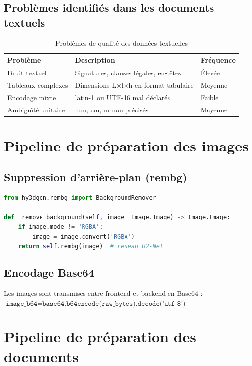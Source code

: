 \documentclass[12pt,a4paper,oneside]{report}
\newcommand{\theadrow}{\rowcolor{tekupblue!12}}
\begin{document}
\subsection{Problèmes identifiés dans les documents textuels}
\begin{table}[H]
\centering
\caption{Problèmes de qualité des données textuelles}
\label{tab:dq}
\begin{tabularx}{\linewidth}{@{}lXl@{}}
\toprule
\theadrow
\textbf{Problème} & \textbf{Description} & \textbf{Fréquence} \\\midrule
Bruit textuel     & Signatures, clauses légales, en-têtes & Élevée \\
Tableaux complexes& Dimensions L×l×h en format tabulaire & Moyenne \\
Encodage mixte    & latin-1 ou UTF-16 mal déclarés & Faible \\
Ambiguïté unitaire& mm, cm, m non précisés & Moyenne \\
\bottomrule
\end{tabularx}
\end{table}

\section{Pipeline de préparation des images}

\subsection{Suppression d'arrière-plan (rembg)}

\begin{lstlisting}[language=Python,
  caption={Suppression d'arrière-plan --- hunyuan3d\_service.py}]
from hy3dgen.rembg import BackgroundRemover

def _remove_background(self, image: Image.Image) -> Image.Image:
    if image.mode != 'RGBA':
        image = image.convert('RGBA')
    return self.rembg(image)  # reseau U2-Net
\end{lstlisting}

\subsection{Encodage Base64}
Les images sont transmises entre frontend et backend en Base64 :
$\texttt{image\_b64} = \texttt{base64.b64encode(raw\_bytes).decode('utf-8')}$

\section{Pipeline de préparation des documents}
\end{document}
